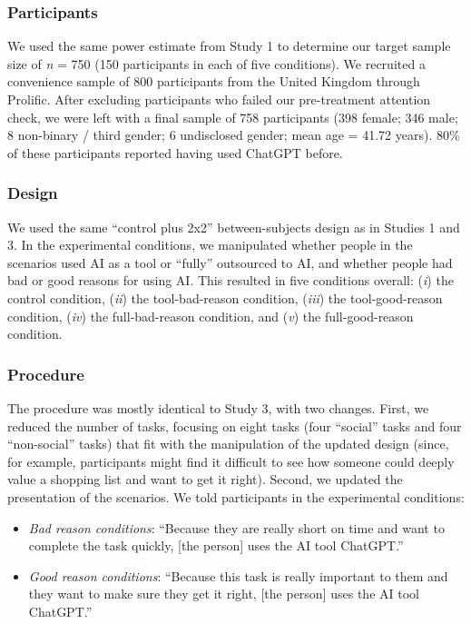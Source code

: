 \documentclass[
  man,
  floatsintext,
  longtable,
  nolmodern,
  notxfonts,
  notimes,
  colorlinks=true,linkcolor=blue,citecolor=blue,urlcolor=blue]{apa7}
\providecommand{\tightlist}{%
  \setlength{\itemsep}{0pt}\setlength{\parskip}{0pt}}
\begin{document}
\subsubsection*{Participants}\label{participants-3}

We used the same power estimate from Study 1 to determine our target
sample size of \emph{n} = 750 (150 participants in each of five
conditions). We recruited a convenience sample of 800 participants from
the United Kingdom through Prolific. After excluding participants who
failed our pre-treatment attention check, we were left with a final
sample of 758 participants (398 female; 346 male; 8 non-binary / third
gender; 6 undisclosed gender; mean age = 41.72 years). 80\% of these
participants reported having used ChatGPT before.

\subsubsection*{Design}\label{design-3}

We used the same ``control plus 2x2'' between-subjects design as in
Studies 1 and 3. In the experimental conditions, we manipulated whether
people in the scenarios used AI as a tool or ``fully'' outsourced to AI,
and whether people had bad or good reasons for using AI. This resulted
in five conditions overall: (\emph{i}) the control condition,
(\emph{ii}) the tool-bad-reason condition, (\emph{iii}) the
tool-good-reason condition, (\emph{iv}) the full-bad-reason condition,
and (\emph{v}) the full-good-reason condition.

\subsubsection*{Procedure}\label{procedure-3}

The procedure was mostly identical to Study 3, with two changes. First,
we reduced the number of tasks, focusing on eight tasks (four ``social''
tasks and four ``non-social'' tasks) that fit with the manipulation of
the updated design (since, for example, participants might find it
difficult to see how someone could deeply value a shopping list and want
to get it right). Second, we updated the presentation of the scenarios.
We told participants in the experimental conditions:

\begin{itemize}
\tightlist
\item
  \emph{Bad reason conditions}: ``Because they are really short on time
  and want to complete the task quickly, {[}the person{]} uses the AI
  tool ChatGPT.''
\item
  \emph{Good reason conditions}: ``Because this task is really important
  to them and they want to make sure they get it right, {[}the person{]}
  uses the AI tool ChatGPT.''
\end{itemize}
\end{document}

